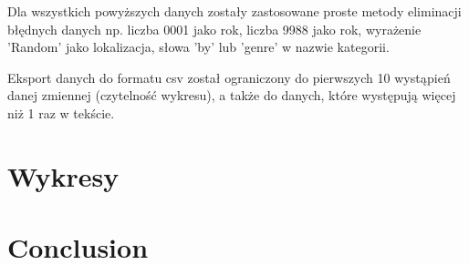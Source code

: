\documentclass[journal]{IEEEtran}
\begin{document}
Dla wszystkich powyższych danych zostały zastosowane proste metody eliminacji błędnych danych
np. liczba 0001 jako rok, liczba 9988 jako rok, wyrażenie 'Random' jako lokalizacja,
słowa 'by' lub 'genre' w nazwie kategorii.

Eksport danych do formatu csv został ograniczony do pierwszych 10 wystąpień danej zmiennej (czytelność wykresu),
a także do danych, które występują więcej niż 1 raz w tekście.

\section{Wykresy}

\newcommand{\namefile}{../Lucene_project/results/cat_loc/cat_loc_American_blues_rock.csv}
\newcommand{\titleplot}{Najcześciej występujące lokalizacje dla grupy 'American blues rock'}
\newcommand{\labx}{Lokacje}
\newcommand{\laby}{Wystąpienia}

\renewcommand{\namefile}{../Lucene_project/results/cat_loc/cat_loc_American_blues.csv}
\renewcommand{\titleplot}{Najcześciej występujące lokalizacje dla grupy 'American blues'}



\section{Conclusion}
\blindtext
\end{document}
